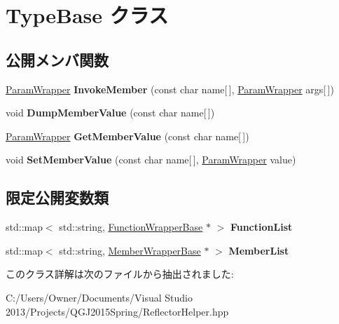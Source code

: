 \hypertarget{class_type_base}{}\section{Type\+Base クラス}
\label{class_type_base}
\subsection*{公開メンバ関数}
\begin{DoxyCompactItemize}
\item 
\hyperlink{struct_param_wrapper}{Param\+Wrapper} {\bfseries Invoke\+Member} (const char name\mbox{[}$\,$\mbox{]}, \hyperlink{struct_param_wrapper}{Param\+Wrapper} args\mbox{[}$\,$\mbox{]})\hypertarget{class_type_base_ad4cca8a58d284e0447f7fff1e671319a}{}\label{class_type_base_ad4cca8a58d284e0447f7fff1e671319a}

\item 
void {\bfseries Dump\+Member\+Value} (const char name\mbox{[}$\,$\mbox{]})\hypertarget{class_type_base_a1434cd986055c222be202c6241cbf170}{}\label{class_type_base_a1434cd986055c222be202c6241cbf170}

\item 
\hyperlink{struct_param_wrapper}{Param\+Wrapper} {\bfseries Get\+Member\+Value} (const char name\mbox{[}$\,$\mbox{]})\hypertarget{class_type_base_a0a1b96a99e65bbef324913d852f4fcf3}{}\label{class_type_base_a0a1b96a99e65bbef324913d852f4fcf3}

\item 
void {\bfseries Set\+Member\+Value} (const char name\mbox{[}$\,$\mbox{]}, \hyperlink{struct_param_wrapper}{Param\+Wrapper} value)\hypertarget{class_type_base_a900f97573266819bfde3322772e17b68}{}\label{class_type_base_a900f97573266819bfde3322772e17b68}

\end{DoxyCompactItemize}
\subsection*{限定公開変数類}
\begin{DoxyCompactItemize}
\item 
std\+::map$<$ std\+::string, \hyperlink{class_function_wrapper_base}{Function\+Wrapper\+Base} $\ast$ $>$ {\bfseries Function\+List}\hypertarget{class_type_base_ac19ee4eac8481c7b77a8981f4bd76f8b}{}\label{class_type_base_ac19ee4eac8481c7b77a8981f4bd76f8b}

\item 
std\+::map$<$ std\+::string, \hyperlink{class_member_wrapper_base}{Member\+Wrapper\+Base} $\ast$ $>$ {\bfseries Member\+List}\hypertarget{class_type_base_a68371a5101fb0695f0bdd74555d0b4b1}{}\label{class_type_base_a68371a5101fb0695f0bdd74555d0b4b1}

\end{DoxyCompactItemize}


このクラス詳解は次のファイルから抽出されました\+:\begin{DoxyCompactItemize}
\item 
C\+:/\+Users/\+Owner/\+Documents/\+Visual Studio 2013/\+Projects/\+Q\+G\+J2015\+Spring/Reflector\+Helper.\+hpp\end{DoxyCompactItemize}

